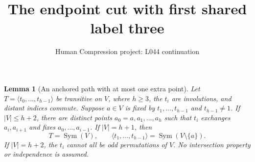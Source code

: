 \documentclass[11pt,a4paper]{article}
\title{The endpoint cut with first shared label three}
\author{Human Compression project: L044 continuation}
\date{}
\newtheorem{lemma}{Lemma}
\newcommand{\gen}[1]{\langle#1\rangle}
\newcommand{\Sym}{\operatorname{Sym}}
\begin{document}
\maketitle

\begin{lemma}[An anchored path with at most one extra point]\label{path}
Let $T=\gen{t_0,\ldots,t_{h-1}}$ be transitive on $V$, where
$h\geq3$, the $t_i$ are involutions, and distant indices commute.
Suppose $a\in V$ is fixed by $t_1,\ldots,t_{h-1}$ and
$t_{h-1}\ne1$. If $|V|\leq h+2$, there are distinct points
$a_0=a,a_1,\ldots,a_h$ such that $t_i$ exchanges $a_i,a_{i+1}$
and fixes $a_0,\ldots,a_{i-1}$.
If $|V|=h+1$, then
\[
 T=\Sym(V),\qquad
 \gen{t_1,\ldots,t_{h-1}}=\Sym(V\setminus\{a\}).        \tag{1}
\]
If $|V|=h+2$, the $t_i$ cannot all be odd permutations of $V$.
No intersection property or independence is assumed.
\end{lemma}
\end{document}
